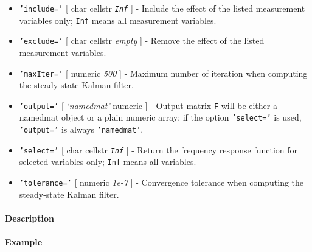  \begin{itemize}
 \item
   \texttt{'include='} {[} char \textbar{} cellstr \textbar{}
   \emph{\texttt{Inf}} {]} - Include the effect of the listed measurement
   variables only; \texttt{Inf} means all measurement variables.
 \item
   \texttt{'exclude='} {[} char \textbar{} cellstr \textbar{}
   \emph{empty} {]} - Remove the effect of the listed measurement
   variables.
 \item
   \texttt{'maxIter='} {[} numeric \textbar{} \emph{500} {]} - Maximum
   number of iteration when computing the steady-state Kalman filter.
 \item
   \texttt{'output='} {[} \emph{`namedmat'} \textbar{} numeric {]} -
   Output matrix \texttt{F} will be either a namedmat object or a plain
   numeric array; if the option \texttt{'select='} is used,
   \texttt{'output='} is always \texttt{'namedmat'}.
 \item
   \texttt{'select='} {[} char \textbar{} cellstr \textbar{}
   \emph{\texttt{Inf}} {]} - Return the frequency response function for
   selected variables only; \texttt{Inf} means all variables.
 \item
   \texttt{'tolerance='} {[} numeric \textbar{} \emph{1e-7} {]} -
   Convergence tolerance when computing the steady-state Kalman filter.
 \end{itemize}
 
 \paragraph{Description}
 
 \paragraph{Example}


